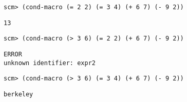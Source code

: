 \begin{lstlisting}
scm> (cond-macro (= 2 2) (= 3 4) (+ 6 7) (- 9 2))
\end{lstlisting}
\begin{solution}[0.25in]
\begin{lstlisting}
13
\end{lstlisting}
\end{solution}

\begin{lstlisting}
scm> (cond-macro (> 3 6) (= 2 2) (+ 6 7) (- 9 2))
\end{lstlisting}
\begin{solution}[0.25in]
\begin{lstlisting}
ERROR
unknown identifier: expr2
\end{lstlisting}
\end{solution}

\begin{lstlisting}
scm> (cond-macro (> 3 6) (= 3 4) (+ 6 7) (- 9 2))
\end{lstlisting}
\begin{solution}[0.25in]
\begin{lstlisting}
berkeley
\end{lstlisting}
\end{solution}
